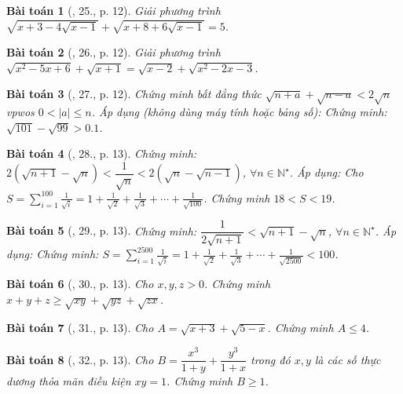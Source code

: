\documentclass{article}
\newtheorem{baitoan}{Bài toán}
\begin{document}
\begin{baitoan}[\cite{Tuyen_Toan_9}, 25., p. 12]
	Giải phương trình $\sqrt{x + 3 - 4\sqrt{x - 1}} + \sqrt{x + 8 + 6\sqrt{x - 1}} = 5$.
\end{baitoan}

\begin{baitoan}[\cite{Tuyen_Toan_9}, 26., p. 12]
	Giải phương trình $\sqrt{x^2 - 5x + 6} + \sqrt{x + 1} = \sqrt{x - 2} + \sqrt{x^2 - 2x - 3}$.
\end{baitoan}

\begin{baitoan}[\cite{Tuyen_Toan_9}, 27., p. 12]
	Chứng minh bất đẳng thức $\sqrt{n + a} + \sqrt{n - a} < 2\sqrt{n}$ vpwos $0 < |a|\le n$. Áp dụng (không dùng máy tính hoặc bảng số): Chứng minh: $\sqrt{101} - \sqrt{99} > 0.1$.
\end{baitoan}

\begin{baitoan}[\cite{Tuyen_Toan_9}, 28., p. 13]
	Chứng minh: $2(\sqrt{n + 1} - \sqrt{n}) < \dfrac{1}{\sqrt{n}} < 2(\sqrt{n} - \sqrt{n - 1})$, $\forall n\in\mathbb{N}^\star$. Áp dụng: Cho $S = \sum_{i=1}^{100} \frac{1}{\sqrt{i}} = 1 + \frac{1}{\sqrt{2}} + \frac{1}{\sqrt{3}} + \cdots + \frac{1}{\sqrt{100}}$. Chứng minh $18 < S < 19$.
\end{baitoan}

\begin{baitoan}[\cite{Tuyen_Toan_9}, 29., p. 13]
	Chứng minh: $\dfrac{1}{2\sqrt{n + 1}} < \sqrt{n + 1} - \sqrt{n}$, $\forall n\in\mathbb{N}^\star$. Áp dụng: Chứng minh: $S = \sum_{i=1}^{2500} \frac{1}{\sqrt{i}} = 1 + \frac{1}{\sqrt{2}} + \frac{1}{\sqrt{3}} + \cdots + \frac{1}{\sqrt{2500}} < 100$.
\end{baitoan}

\begin{baitoan}[\cite{Tuyen_Toan_9}, 30., p. 13]
	Cho $x,y,z > 0$. Chứng minh $x + y + z\ge\sqrt{xy} + \sqrt{yz} + \sqrt{zx}$.
\end{baitoan}

\begin{baitoan}[\cite{Tuyen_Toan_9}, 31., p. 13]
	Cho $A = \sqrt{x + 3} + \sqrt{5 - x}$. Chứng minh $A\le4$.
\end{baitoan}

\begin{baitoan}[\cite{Tuyen_Toan_9}, 32., p. 13]
	Cho $B = \dfrac{x^3}{1 + y} + \dfrac{y^3}{1 + x}$ trong đó $x,y$ là các số thực dương thỏa mãn điều kiện $xy = 1$. Chứng minh $B\ge1$.
\end{baitoan}
\end{document}
